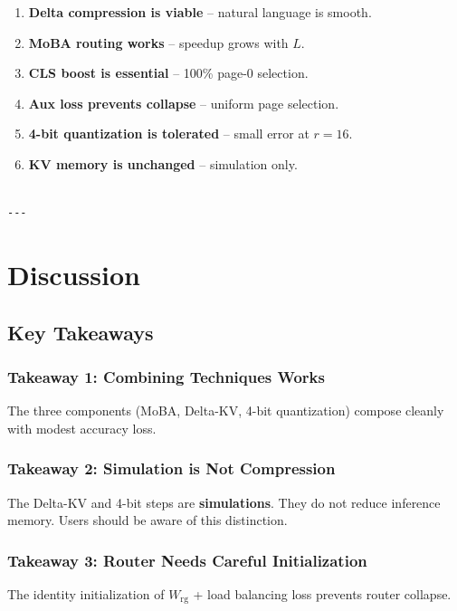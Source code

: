 \begin{enumerate}
\item \textbf{Delta compression is viable} -- natural language is smooth.
\item \textbf{MoBA routing works} -- speedup grows with $L$.
\item \textbf{CLS boost is essential} -- 100\% page-0 selection.
\item \textbf{Aux loss prevents collapse} -- uniform page selection.
\item \textbf{4-bit quantization is tolerated} -- small error at $r = 16$.
\item \textbf{KV memory is unchanged} -- simulation only.
\end{enumerate}
\begin{lstlisting}

---
\end{lstlisting}

\section{Discussion}

\subsection{Key Takeaways}

\subsubsection{Takeaway 1: Combining Techniques Works}

The three components (MoBA, Delta-KV, 4-bit quantization) compose cleanly 
with modest accuracy loss.

\subsubsection{Takeaway 2: Simulation is Not Compression}

The Delta-KV and 4-bit steps are \textbf{simulations}. They do not reduce 
inference memory. Users should be aware of this distinction.

\subsubsection{Takeaway 3: Router Needs Careful Initialization}

The identity initialization of $W_\text{rg}$ + load balancing loss prevents 
router collapse.

